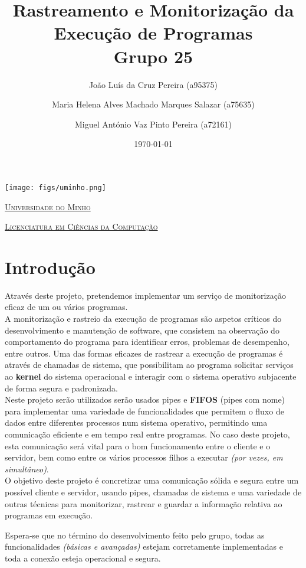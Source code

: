 \documentclass[11.5pt,a4paper]{report}
\title{Rastreamento e Monitorização da Execução de Programas\\
                        \textbf{Grupo 25\\
                        }}
\author{João Luís da Cruz Pereira (a95375) \and
Maria Helena Alves Machado Marques Salazar (a75635) \and
Miguel António Vaz Pinto Pereira (a72161)\\}
\date{\today}
\begin{document}
\begin{minipage}{0.9\linewidth}
        \centering
		\texttt{[image: figs/uminho.png]}\par\vspace{1cm}
                \href{https://www.uminho.pt/PT}
		{\scshape\LARGE Universidade do Minho} \par
		\vspace{0.6cm}
                \href{https://lcc.di.uminho.pt}
		{\scshape\Large Licenciatura em Ciências da Computação} \par
		\maketitle
	\end{minipage}

\maketitle
\tableofcontents
\newpage
\chapter{Introdução}
Através deste projeto, pretendemos implementar um serviço de monitorização eficaz de um ou vários programas.\\

A monitorização e rastreio da execução de programas são aspetos críticos do desenvolvimento e manutenção de software, que consistem na observação do comportamento do programa para identificar erros, problemas de desempenho, entre outros. Uma das formas eficazes de rastrear a execução de programas é através de chamadas de sistema, que possibilitam ao programa solicitar serviços ao \textbf{kernel} do sistema operacional e interagir com o sistema operativo subjacente de forma segura e padronizada.\\

Neste projeto serão utilizados serão usados pipes e \textbf{FIFOS} (pipes com nome) para implementar uma variedade de funcionalidades que permitem o fluxo de dados entre diferentes processos num sistema operativo, permitindo uma comunicação eficiente e em tempo real entre programas. No caso deste projeto, esta comunicação será vital para o bom funcionamento entre o cliente e o servidor, bem como entre os vários processos filhos a executar \textit{(por vezes, em simultâneo)}.\\

O objetivo deste projeto é concretizar uma comunicação sólida e segura entre um possível cliente e servidor, usando pipes, chamadas de sistema e uma variedade de outras técnicas para monitorizar, rastrear e guardar a informação relativa ao programas em execução.\par 
Espera-se que no término do desenvolvimento feito pelo grupo, todas as funcionalidades \textit{(básicas e avançadas)} estejam corretamente implementadas e toda a conexão esteja operacional e segura.
\end{document}
